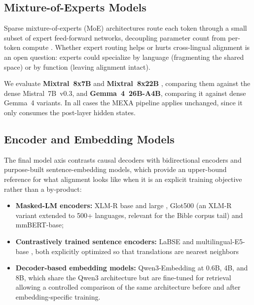 \subsection{Mixture-of-Experts Models}
\label{subsec:moe-models}

Sparse mixture-of-experts (MoE) architectures route each token through a
small subset of expert feed-forward networks, decoupling parameter count
from per-token compute \citep{jiang2024mixtral}. Whether expert routing helps or hurts cross-lingual alignment is an open question: 
experts could specialize by language (fragmenting the shared space) or by function (leaving alignment intact). 

We evaluate \textbf{Mixtral~8x7B} and \textbf{Mixtral~8x22B} \citep{jiang2024mixtral}, comparing them against
the dense  Mistral~7B~v0.3, and \textbf{Gemma~4~26B-A4B},
comparing it against dense Gemma~4 variants. In all cases the MEXA
pipeline applies unchanged, since it only consumes the post-layer hidden states.

\subsection{Encoder and Embedding Models}
\label{subsec:encoder-models}

The final model axis contrasts causal decoders with bidirectional
encoders and purpose-built sentence-embedding models, which provide an
upper-bound reference for what alignment looks like when it is an explicit
training objective rather than a by-product:

\begin{itemize}
    \item \textbf{Masked-LM encoders:} XLM-R base and large
    \citep{conneau2020xlmr}, Glot500 \citep{imani2023glot500} (an XLM-R
    variant extended to 500+ languages, relevant for the
    Bible corpus tail) and mmBERT-base;
    \item \textbf{Contrastively trained sentence encoders:} LaBSE
    \citep{feng2022labse} and multilingual-E5-base
    \citep{wang2024multilingual}, both explicitly optimized so that
    translations are nearest neighbors
    \item \textbf{Decoder-based embedding models:} Qwen3-Embedding at
    0.6B, 4B, and 8B, which share the Qwen3 architecture but are fine-tuned
    for retrieval allowing a controlled comparison of the same
    architecture before and after embedding-specific training.
\end{itemize}


